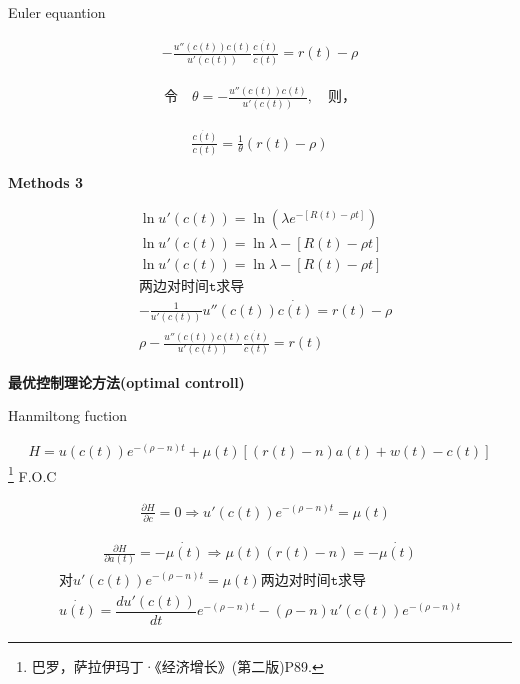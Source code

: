 Euler equantion 

\begin{gather}
	-\frac{u''(c(t))c(t)}{u'(c(t))}\frac{\dot{c(t)}}{c(t)}=r(t)-\rho
\end{gather}

\begin{gather}
	\texttt{令}\quad\theta=	-\frac{u''(c(t))c(t)}{u'(c(t))},\quad \texttt{则}，
\end{gather}

\begin{gather}
	\frac{\dot{c(t)}}{c(t)}=\frac{1}{\theta}(r(t)-\rho)
\end{gather}


\textbf{Methods 3}


\begin{equation}
	\begin{split}
	&\ln u'(c(t))=\ln(\lambda e^{-[R(t)-\rho t]})
	\\
	&\ln u'(c(t))=\ln\lambda-[R(t)-\rho t]
	\\
	&\ln u'(c(t))=\ln\lambda-[R(t)-\rho t]
	\\
	&\texttt{两边对时间t求导}
	\\
	&-\frac{1}{u'(c(t))}u''(c(t))\dot{c(t)}=r(t)-\rho
	\\
	&\rho-\frac{u''(c(t)) c(t)}{u'(c(t))}\frac{\dot{c(t)}}{c(t)}=r(t)
	\end{split}
\end{equation}

\textbf{最优控制理论方法(optimal controll)}

Hanmiltong fuction

\begin{gather}
H=u(c(t))e^{-(\rho-n)t}+\mu(t)[(r(t)-n)a(t)+w(t)-c(t)]
\end{gather}
\footnote{巴罗，萨拉伊玛丁·《经济增长》(第二版)P89.}
F.O.C

\begin{align}\label{1.25}
&\frac{\partial H}{\partial c}=0 \Rightarrow u'(c(t))e^{-(\rho-n)t}=\mu(t)
\end{align}

\begin{align}\label{1.26}
	\frac{\partial H}{\partial a(t)}=-\dot{\mu(t)}
\Rightarrow \mu(t)(r(t)-n)	=-\dot{\mu(t)}
\end{align}
\begin{gather}
\texttt{对}u'(c(t))e^{-(\rho-n)t}=\mu(t)\texttt{两边对时间t求导}
\\
\dot{u(t)}=\dfrac{d u'(c(t))}{dt}e^{-(\rho-n)t}-(\rho-n)u'(c(t))e^{-(\rho-n)t}	
\end{gather}

